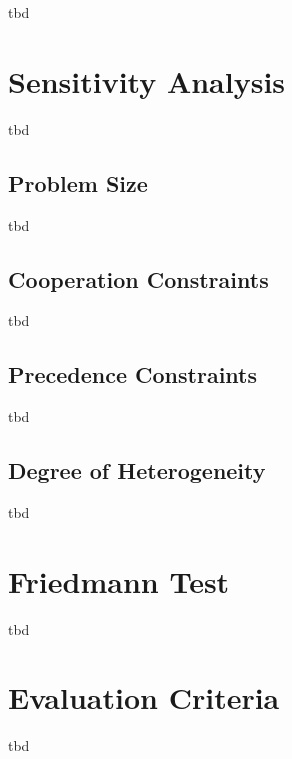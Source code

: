 tbd

\section{Sensitivity Analysis}

tbd

\subsection{Problem Size}

tbd

\subsection{Cooperation Constraints}

tbd

\subsection{Precedence Constraints}

tbd

\subsection{Degree of Heterogeneity}

tbd

\section{Friedmann Test}

tbd



\newpage

\section{Evaluation Criteria}

tbd

\newpage